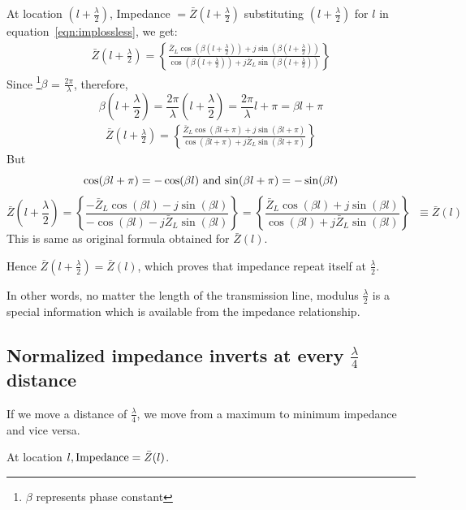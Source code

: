 At location ${\left(l+\frac{\lambda}{2}\right)}$, Impedance $= \bar{Z}\left(l+\frac{\lambda}{2}\right)$ substituting ${\left(l+\frac{\lambda}{2}\right)}$ for $l$ in equation~\eqref{eqn:implossless}, we get: 
\begin{align*}
\bar{Z}\left(l+\frac{\lambda}{2}\right) = \left\lbrace \frac{\bar{Z}_L \cos(\beta \left(l+\frac{\lambda}{2}\right)) + j\sin(\beta \left(l+\frac{\lambda}{2}\right))}{\cos(\beta \left(l+\frac{\lambda}{2}\right)) + j\bar{Z}_L \sin(\beta \left(l+\frac{\lambda}{2}\right))}\right\rbrace 
\end{align*}
Since \footnote{$\beta$ represents phase constant}$\beta$ = $ \frac{2\pi}{\lambda}$, therefore,
\begin{dmath*}
\beta\left(l+\frac{\lambda}{2}\right)=\frac{2\pi}{\lambda}\left(l+\frac{\lambda}{2}\right)=\frac{2\pi}{\lambda}l+\pi=\beta l+\pi
\end{dmath*}
\begin{align*}
\bar{Z}\left(l+\frac{\lambda}{2}\right) = \left\lbrace \frac{\bar{Z}_L\cos(\beta l+\pi) + j\sin(\beta l+\pi)}{\cos(\beta l+\pi) + j\bar{Z}_L\sin(\beta l+\pi)}\right\rbrace 
\end{align*}
But 
\[
\cos(\beta l+\pi)=-\cos(\beta l)$ and $\sin(\beta l+\pi)=-\sin(\beta l)
\] 
\begin{dmath*}
\bar{Z}\left(l+\frac{\lambda}{2}\right)=\left\lbrace \frac{-\bar{Z}_L \cos(\beta l) - j\sin(\beta l)}{-\cos(\beta l) - j\bar{Z}_L \sin(\beta l)}\right\rbrace = \left\lbrace \frac{\bar{Z}_L \cos(\beta l) + j\sin(\beta l)}{\cos(\beta l) + j\bar{Z}_L \sin(\beta l)}\right\rbrace\;\;\equiv\bar{Z}(l)
\end{dmath*} 
This is same as original formula obtained for $\bar{Z}(l)$.

Hence $\bar{Z}\left(l+\frac{\lambda}{2}\right)=\bar{Z}(l)$, which proves that impedance repeat itself at $\frac{\lambda}{2}$.

In other words, no matter the length of the transmission line, modulus $\frac{\lambda}{2}$ is  a special information which is available from the impedance relationship.

\subsection{Normalized impedance inverts at every $\frac{\lambda}{4}$ distance}
If we move a distance of $\frac{\lambda}{4}$, we move from a maximum to minimum impedance and vice versa.

At location $l, \textnormal{Impedance}=\bar{Z}(l)$.


